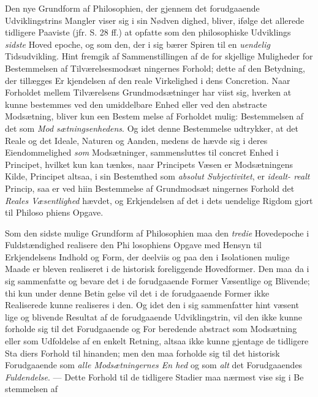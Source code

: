 Den nye Grundform af Philosophien, der gjennem det
forudgaaende Udviklingstrins Mangler viser sig i sin Nødven\-%
dighed, bliver, ifølge det allerede tidligere Paaviste (jfr. S. 28 ff.)
at opfatte som den philosophiske Udviklings \emph{sidste} Hoved\-%
epoche, og som den, der i sig bærer Spiren til en \emph{uendelig}
Tidsudvikling. Hint fremgik af Sammenstillingen af de for\-%
skjellige Muligheder for Bestemmelsen af Tilværelsesmodsæt\-%
ningernes Forhold; dette af den Betydning, der tillægges Er\-%
kjendelsen af den reale Virkelighed i dens Concretion. Naar
Forholdet mellem Tilværelsens Grundmodsætninger har viist
sig, hverken at kunne bestemmes ved den umiddelbare Enhed
 eller ved den abstracte Modsætning, bliver kun een Bestem\-%
melse af Forholdet mulig: Bestemmelsen af det som \emph{Mod\-%
sætningsenhedens}. Og idet denne Bestemmelse udtrykker,
at det Reale og det Ideale, Naturen og Aanden, medens de hævde
sig i deres Eiendommelighed \emph{som} Modsætninger, sammensluttes
til concret Enhed i Principet, hvilket kun kan tænkes, naar
Principets Væsen er Modsætningens Kilde, Principet altsaa, i
sin Bestemthed som \emph{absolut Subjectivitet}, er \emph{idealt-%
realt} Princip, saa er ved hiin Bestemmelse af Grundmodsæt\-%
ningernes Forhold det \emph{Reales Væsentlighed} hævdet, og
Erkjendelsen af det i dets uendelige Rigdom gjort til Philoso\-%
phiens Opgave.

Som den sidste mulige Grundform af Philosophien maa
den \emph{tredie} Hovedepoche i Fuldstændighed realisere den Phi\-%
losophiens Opgave med Hensyn til Erkjendelsens Indhold og
Form, der deelviis og paa den i Isolationen mulige Maade er
bleven realiseret i de historisk foreliggende Hovedformer. Den
maa da i sig sammenfatte og bevare det i de forudgaaende
Former Væsentlige og Blivende; thi kun under denne Betin\-%
gelse vil det i de forudgaaende Former ikke Realiserede kunne
realiseres i den. Og idet den i sig sammenfatter hint væsent\-%
lige og blivende Resultat af de forudgaaende Udviklingstrin,
vil den ikke kunne forholde sig til det Forudgaaende og For\-%
beredende abstract som Modsætning eller som Udfoldelse af en
enkelt Retning, altsaa ikke kunne gjentage de tidligere Sta\-%
diers Forhold til hinanden; men den maa forholde sig til det
historisk Forudgaaende som \emph{alle Modsætningernes En\-%
hed} og som \emph{alt} det Forudgaaendes \emph{Fuldendelse}. --- Dette
Forhold til de tidligere Stadier maa nærmest vise sig i Be\-%
stemmelsen af

